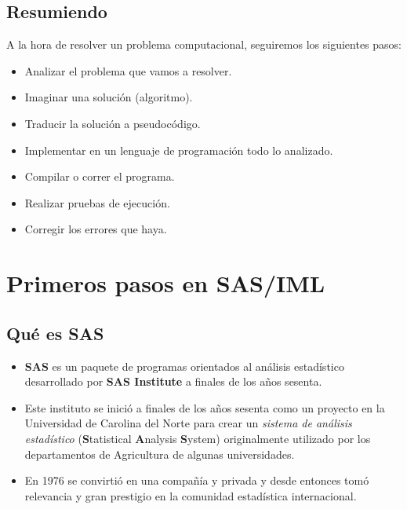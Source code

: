 \documentclass[
]{book}
\providecommand{\tightlist}{%
  \setlength{\itemsep}{0pt}\setlength{\parskip}{0pt}}
\begin{document}
\hypertarget{resumiendo}{%
\section{Resumiendo}\label{resumiendo}}

A la hora de resolver un problema computacional, seguiremos los siguientes pasos:

\begin{itemize}
\tightlist
\item
  Analizar el problema que vamos a resolver.
\item
  Imaginar una solución (algoritmo).
\item
  Traducir la solución a pseudocódigo.
\item
  Implementar en un lenguaje de programación todo lo analizado.
\item
  Compilar o correr el programa.
\item
  Realizar pruebas de ejecución.
\item
  Corregir los errores que haya.
\end{itemize}

\hypertarget{primeros-pasos-en-sasiml}{%
\chapter{Primeros pasos en SAS/IML}\label{primeros-pasos-en-sasiml}}

\hypertarget{quuxe9-es-sas}{%
\section{Qué es SAS}\label{quuxe9-es-sas}}

\begin{itemize}
\tightlist
\item
  \textbf{SAS} es un paquete de programas orientados al análisis estadístico desarrollado por \textbf{SAS Institute} a finales de los años sesenta.
\item
  Este instituto se inició a finales de los años sesenta como un proyecto en la Universidad de Carolina del Norte para crear un \emph{sistema de análisis estadístico} (\textbf{S}tatistical \textbf{A}nalysis \textbf{S}ystem) originalmente utilizado por los departamentos de Agricultura de algunas universidades.
\item
  En 1976 se convirtió en una compañía y privada y desde entonces tomó relevancia y gran prestigio en la comunidad estadística internacional.
\end{itemize}
\end{document}
